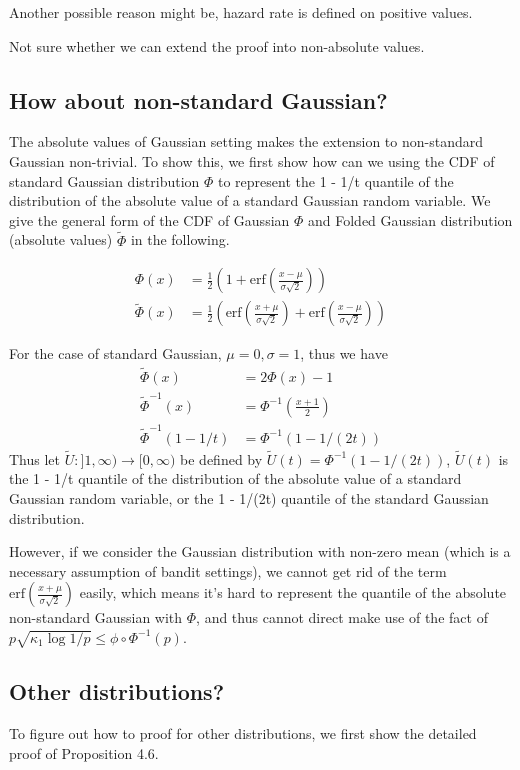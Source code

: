 \documentclass{article}
\theoremstyle{plain}
\begin{document}
Another possible reason might be, hazard rate is defined on positive values.

Not sure whether we can extend the proof into non-absolute values.

\subsection{How about non-standard Gaussian?}
The absolute values of Gaussian setting makes the extension to non-standard Gaussian non-trivial. To show this, we first show how can we using the CDF of standard Gaussian distribution $\Phi$ to represent the 1 - 1/t quantile of the distribution of the absolute value of a standard Gaussian random variable. We give the general form of the CDF of Gaussian $\Phi$ and Folded Gaussian distribution (absolute values) $\tilde{\Phi}$ in the following.

\begin{align}
    \Phi(x) &= \frac{1}{2}\left(1 + \text{erf}(\frac{x - \mu}{\sigma \sqrt{2}})\right)\\
    \tilde{\Phi}(x) &= \frac{1}{2}\left(\text{erf}(\frac{x + \mu}{\sigma \sqrt{2}}) + \text{erf}(\frac{x - \mu}{\sigma \sqrt{2}})\right) 
\end{align}

For the case of standard Gaussian, $\mu = 0, \sigma = 1$, thus we have 
\begin{align}
    \tilde{\Phi}(x) &= 2 \Phi(x) - 1\\
    \tilde{\Phi}^{-1}(x) &= \Phi^{-1}(\frac{x+1}{2})\\
    \tilde{\Phi}^{-1}(1 - 1/t) &= \Phi^{-1}(1 - 1/(2t))
\end{align}
Thus let $\tilde{U} : ] 1, \infty ) \rightarrow[0, \infty)$ be defined by $\widetilde{U}(t)=\Phi^{-1}(1-1 /(2 t))$, $\widetilde{U}(t)$ is the 1 - 1/t quantile of the distribution of the absolute value of a standard Gaussian random variable, or the 1 - 1/(2t) quantile of the standard Gaussian distribution. 

However, if we consider the Gaussian distribution with non-zero mean (which is a necessary assumption of bandit settings), we cannot get rid of the term $\text{erf}(\frac{x + \mu}{\sigma \sqrt{2}})$ easily, which means it's hard to represent the quantile of the absolute non-standard Gaussian with $\Phi$, and thus cannot direct make use of the fact of $p \sqrt{\kappa_{1} \log 1 / p} \leq \phi \circ \Phi^{-1}(p)$.

\subsection{Other distributions?}
To figure out how to proof for other distributions, we first show the detailed proof of \cite{boucheron2012} Proposition 4.6. 
\end{document}
